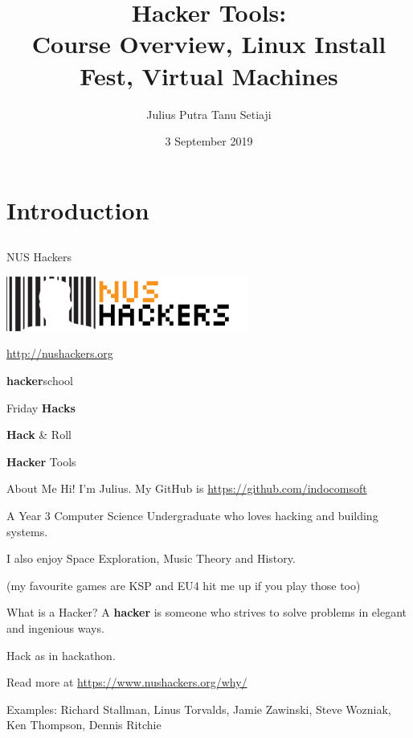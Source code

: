\documentclass[11pt]{beamer}
\title{Hacker Tools: \\Course Overview, Linux Install Fest, Virtual Machines}
\author{Julius Putra Tanu Setiaji}
\date{3 September 2019}
\begin{document}
\frame[plain]{\titlepage}

\section{Introduction}
\subsection{}

\begin{frame}{NUS Hackers}

  \begin{center}
    \includegraphics[width=0.5\linewidth]{../NUSHackers}

    \url{http://nushackers.org}
  \end{center}

  \begin{center}
    \textbf{hacker}school

    Friday \textbf{Hacks}

    \textbf{Hack} \& Roll

    \textbf{Hacker} Tools
  \end{center}

\end{frame}

\begin{frame}{About Me}
  Hi! I'm Julius. My GitHub is \url{https://github.com/indocomsoft}

  A Year 3 Computer Science Undergraduate who loves hacking and building systems.

  I also enjoy Space Exploration, Music Theory and History.

    {\tiny (my favourite games are KSP and EU4 hit me up if you play those too)}
\end{frame}

\begin{frame}{What is a Hacker?}
  A \textbf{hacker} is someone who strives to solve problems in elegant and ingenious ways.

  Hack as in hackathon.

  Read more at \url{https://www.nushackers.org/why/}

  Examples: Richard Stallman, Linus Torvalds, Jamie Zawinski, Steve Wozniak, Ken Thompson, Dennis Ritchie
\end{frame}
\end{document}
